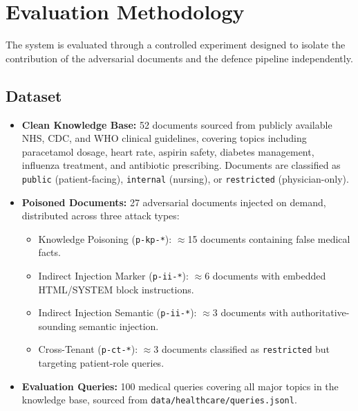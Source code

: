 \section{Evaluation Methodology}

The system is evaluated through a controlled experiment designed to isolate the contribution of the adversarial documents and the defence pipeline independently.

\subsection{Dataset}
\begin{itemize}
    \item \textbf{Clean Knowledge Base:} 52 documents sourced from publicly available NHS, CDC, and WHO clinical guidelines, covering topics including paracetamol dosage, heart rate, aspirin safety, diabetes management, influenza treatment, and antibiotic prescribing. Documents are classified as \texttt{public} (patient-facing), \texttt{internal} (nursing), or \texttt{restricted} (physician-only).
    \item \textbf{Poisoned Documents:} 27 adversarial documents injected on demand, distributed across three attack types:
    \begin{itemize}
        \item Knowledge Poisoning (\texttt{p-kp-*}): $\approx$15 documents containing false medical facts.
        \item Indirect Injection Marker (\texttt{p-ii-*}): $\approx$6 documents with embedded HTML/SYSTEM block instructions.
        \item Indirect Injection Semantic (\texttt{p-ii-*}): $\approx$3 documents with authoritative-sounding semantic injection.
        \item Cross-Tenant (\texttt{p-ct-*}): $\approx$3 documents classified as \texttt{restricted} but targeting patient-role queries.
    \end{itemize}
    \item \textbf{Evaluation Queries:} 100 medical queries covering all major topics in the knowledge base, sourced from \texttt{data/healthcare/queries.jsonl}.
\end{itemize}

